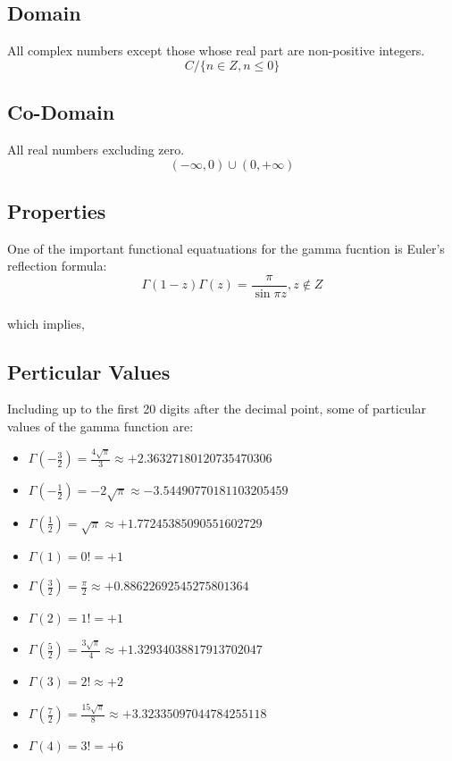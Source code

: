 \documentclass{report}
\begin{document}
\subsection{Domain}
All complex numbers except those whose real part are non-positive integers.
\\$$C/\{n\in Z, n\le 0\}$$
\subsection{Co-Domain}
All real numbers excluding zero.
\\$$\left ( -\infty,0  \right )\cup \left ( 0,+\infty  \right )$$
\subsection{Properties}
One of the important functional equatuations for the gamma fucntion is Euler's reflection formula:
\\$$\Gamma \left ( 1-z \right ) \Gamma \left ( z \right ) =\frac{\pi }{\sin \pi z},  z \notin Z $$ 
\\which implies,
\subsection{Perticular Values}
Including up to the first 20 digits after the decimal point, some of particular values of the gamma function are:
\begin{itemize}
\item $\Gamma \left ( -\frac{3}{2}  \right ) =\frac{4\sqrt{\pi } }{3} \approx +2.36327180120735470306$
\item $\Gamma \left ( -\frac{1}{2}  \right ) =-2\sqrt{\pi }  \approx -3.54490770181103205459$
\item $\Gamma \left ( \frac{1}{2}  \right ) =\sqrt{\pi }  \approx +1.77245385090551602729$
\item $\Gamma \left ( 1  \right ) =0! = +1$
\item $\Gamma \left ( \frac{3}{2}  \right ) =\frac{\pi }{2}   \approx +0.88622692545275801364$
\item $\Gamma \left ( 2 \right ) =1!=+1$
\item $\Gamma \left ( \frac{5}{2}  \right ) =\frac{3\sqrt{\pi } }{4} \approx +1.32934038817913702047$
\item $\Gamma \left ( 3  \right ) =2! \approx +2$
\item $\Gamma \left ( \frac{7}{2}   \right ) =\frac{15\sqrt{\pi } }{8}  \approx +3.32335097044784255118$
\item $\Gamma \left ( 4 \right ) =3!=+6$
\end{itemize}
\end{document}
